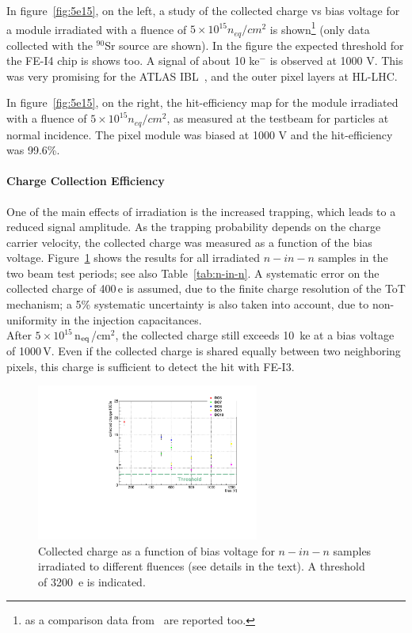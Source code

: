 In figure~\ref{fig:5e15}, on the left, a study of the collected charge vs bias voltage
 for a module irradiated with a fluence of $5\times 10^{15} n_{eq}/cm^{2}$ is shown\footnote{as
 a comparison data from~\cite{Casse} are reported too.} (only data collected with the
 $^{90}$Sr  source are shown).  In the figure the expected threshold for the FE-I4
 chip is shows too. A signal of about 10 ke$^-$ is observed at 1000 V. This was very
 promising for the  ATLAS IBL~\cite{IBLTDR}, and
  the outer pixel layers at HL-LHC.

In figure~\ref{fig:5e15}, on the right, the hit-efficiency map for the module irradiated with a
fluence of $5\times 10^{15} n_{eq}/cm^{2}$, as measured at the testbeam for particles
at normal incidence. The pixel module was biased at 1000 V and the hit-efficiency was 99.6\%.


\paragraph{Charge Collection Efficiency}
One of the main effects of irradiation is the increased trapping, which leads to a reduced signal amplitude. 
As the trapping probability depends on the charge carrier velocity, the collected charge was measured as a 
function of the bias voltage. Figure~\ref{fig:DO_all_Save} shows the results for all irradiated $n-in-n$ 
samples in the two beam test periods; see also Table~\ref{tab:n-in-n}. A systematic error on the collected 
charge of 400\,e is assumed, due to the finite charge resolution of the ToT mechanism;  a 5\% systematic 
uncertainty is also taken into account, due to non-uniformity in the injection capacitances.\\
After $5\times 10^{15}$\,n$_{\rm eq}$/cm$^2$, the collected charge still exceeds 10~ke at a bias voltage of 
1000\,V. Even if the collected charge is shared equally between two neighboring pixels, this charge is 
sufficient to detect the hit with FE-I3.

\begin{figure}[!htpb]
 \begin{center}
  \includegraphics[width=0.65\textwidth]{DO_all_Save.pdf}
 \end{center}
 \caption{\label{fig:DO_all_Save}Collected charge as a function of bias voltage for $n-in-n$ samples irradiated to different fluences
 (see details in the text).
 A threshold of 3200~e is indicated.}
\end{figure}

